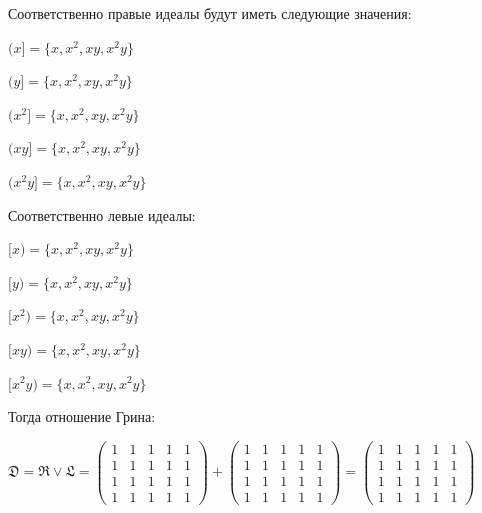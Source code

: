 \documentclass[bachelor, och, labwork]{shiza}
\begin{document}
      Соответственно правые идеалы будут иметь следующие значения:

      \begin{center}

        $(x] = \{x, x^2, xy, x^2y\}$

        $(y] = \{x, x^2, xy, x^2y\}$
  
        $(x^2] = \{x, x^2, xy, x^2y\}$
  
        $(xy] = \{x, x^2, xy, x^2y\}$
    
        $(x^2y] = \{x, x^2, xy, x^2y\}$

      \end{center}

      Соответственно левые идеалы:


      \begin{center}

        $[x) = \{x, x^2, xy, x^2y\}$

        $[y) = \{x, x^2, xy, x^2y\}$
  
        $[x^2) = \{x, x^2, xy, x^2y\}$
  
        $[xy) = \{x, x^2, xy, x^2y\}$
    
        $[x^2y) = \{x, x^2, xy, x^2y\}$

      \end{center}

      Тогда отношение Грина: 

      $\mathfrak{D} = \mathfrak{R} \vee \mathfrak{L} =
      \begin{pmatrix}
        1 & 1 & 1 & 1 & 1 \\
        1 & 1 & 1 & 1 & 1 \\
        1 & 1 & 1 & 1 & 1 \\
        1 & 1 & 1 & 1 & 1
      \end{pmatrix} +
      \begin{pmatrix}
        1 & 1 & 1 & 1 & 1 \\
        1 & 1 & 1 & 1 & 1 \\
        1 & 1 & 1 & 1 & 1 \\
        1 & 1 & 1 & 1 & 1
      \end{pmatrix} =
      \begin{pmatrix}
        1 & 1 & 1 & 1 & 1 \\
        1 & 1 & 1 & 1 & 1 \\
        1 & 1 & 1 & 1 & 1 \\
        1 & 1 & 1 & 1 & 1
      \end{pmatrix}$
\end{document}
